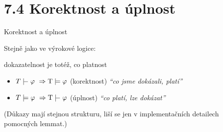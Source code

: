 \documentclass{beamer}
\begin{document}
\section{7.4 Korektnost a úplnost}


\begin{frame}{Korektnost a úplnost}
    
    Stejně jako ve výrokové logice:
    
    \begin{center}
        \alert{dokazatelnost} je totéž, co \alert{platnost}    
    \end{center}
    

    \begin{itemize}
        \item \alert{$T\proves\varphi\ \Rightarrow\T\models\varphi$} \hspace{0.5cm} (korektnost) \hfill {\it``co jsme dokázali, platí''}
        \item\alert{$T\models\varphi\ \Rightarrow\T\proves\varphi$}  \hspace{0.5cm} (úplnost) \hfill {\it ``co platí, lze dokázat''}
    \end{itemize} 

    \bigskip

    (Důkazy mají stejnou strukturu, liší se jen v implementačních detailech pomocných lemmat.)
 
\end{frame}
\end{document}

